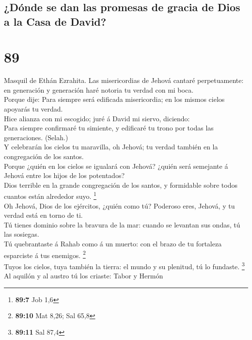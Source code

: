 \hypertarget{duxf3nde-se-dan-las-promesas-de-gracia-de-dios-a-la-casa-de-david}{%
\subsection{¿Dónde se dan las promesas de gracia de Dios a la Casa de
David?}\label{duxf3nde-se-dan-las-promesas-de-gracia-de-dios-a-la-casa-de-david}}

\hypertarget{section-88}{%
\section{89}\label{section-88}}

 Masquil de Ethán Ezrahita. Las misericordias de Jehová
cantaré perpetuamente: en generación y generación haré notoria tu verdad
con mi boca.\\
 Porque dije: Para siempre será edificada misericordia; en
los mismos cielos apoyarás tu verdad.\\
 Hice alianza con mi escogido; juré á David mi siervo,
diciendo:\\
 Para siempre confirmaré tu simiente, y edificaré tu trono
por todas las generaciones. (Selah.)\\
 Y celebrarán los cielos tu maravilla, oh Jehová; tu
verdad también en la congregación de los santos.\\
 Porque ¿quién en los cielos se igualará con Jehová?
¿quién será semejante á Jehová entre los hijos de los potentados?\\
 Dios terrible en la grande congregación de los santos, y
formidable sobre todos cuantos están alrededor suyo. \footnote{\textbf{89:7}
  Job 1,6}\\
 Oh Jehová, Dios de los ejércitos, ¿quién como tú?
Poderoso eres, Jehová, y tu verdad está en torno de ti.\\
 Tú tienes dominio sobre la bravura de la mar: cuando se
levantan sus ondas, tú las sosiegas.\\
 Tú quebrantaste á Rahab como á un muerto: con el brazo
de tu fortaleza esparciste á tus enemigos. \footnote{\textbf{89:10} Mat
  8,26; Sal 65,8}\\
 Tuyos los cielos, tuya también la tierra: el mundo y su
plenitud, tú lo fundaste. \footnote{\textbf{89:11} Sal 87,4}\\
 Al aquilón y al austro tú los criaste: Tabor y Hermón
